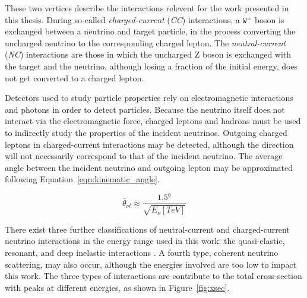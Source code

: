These two vertices describe the interactions relevent for the work presented in this thesis.
During so-called \emph{charged-current} (\emph{CC}) interactions, a $\mathtt{W^{\pm}}$ boson is exchanged between a neutrino and target particle, in the process converting the uncharged neutrino to the corresponding charged lepton.
The \emph{neutral-current} (\emph{NC}) interactions are those in which the uncharged Z boson is exchanged with the target and the neutrino, although losing a fraction of the initial energy, does not get converted to a charged lepton.

Detectors used to study particle properties rely on electromagnetic interactions and photons in order to detect particles.
Because the neutrino itself does not interact via the electromagnetic force, charged leptons and hadrons must be used to indirectly study the properties of the incident neutrinos.
Outgoing charged leptons in charged-current interactions may be detected, although the direction will not necessarily correspond to that of the incident neutrino. 
The average angle between the incident neutrino and outgoing lepton may be approximated following Equation~\ref{eqn:kinematic_angle}.

\begin{equation}
\bar{\theta}_{\nu l} \approx \frac{\mathtt{1.5^o}}{\sqrt{E_\nu \left[TeV\right]}}
\label{eqn:kinematic_angle}
\end{equation}

There exist three further classifications of neutral-current and charged-current neutrino interactions in the energy range used in this work: the quasi-elastic, resonant, and deep inelastic interactions \cite{Formaggio-Xsec}.
A fourth type, coherent neutrino scattering, may also occur, although the energies involved are too low to impact this work.
The three types of interactions are contribute to the total cross-section with peaks at different energies, as shown in Figure~\ref{fig:xsec}.

